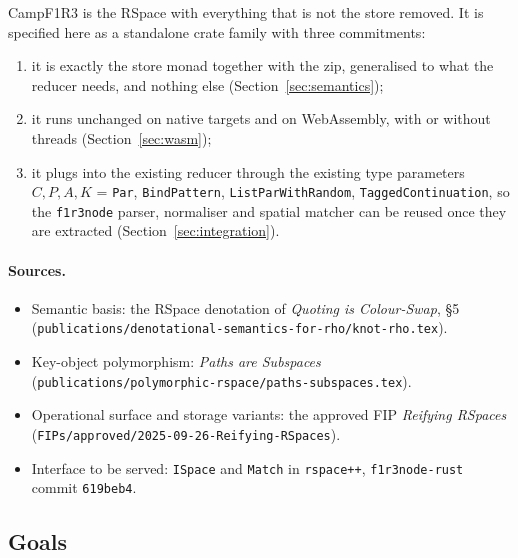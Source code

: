 \documentclass[11pt]{article}
\theoremstyle{plain}
\theoremstyle{definition}
\newcommand{\Camp}{CampF1R3}
\newcommand{\code}[1]{\texttt{#1}}
\begin{document}
\Camp{} is the RSpace with everything that is not the store removed. It is
specified here as a standalone crate family with three commitments:
\begin{enumerate}[nosep]
\item it is exactly the store monad together with the zip, generalised to what
      the reducer needs, and nothing else (Section~\ref{sec:semantics});
\item it runs unchanged on native targets and on WebAssembly, with or without
      threads (Section~\ref{sec:wasm});
\item it plugs into the existing reducer through the existing type parameters
      $C,P,A,K$ = \code{Par}, \code{BindPattern}, \code{ListParWithRandom},
      \code{TaggedContinuation}, so the \code{f1r3node} parser, normaliser and
      spatial matcher can be reused once they are extracted
      (Section~\ref{sec:integration}).
\end{enumerate}

\paragraph{Sources.}
\begin{itemize}[nosep]
\item Semantic basis: the RSpace denotation of \emph{Quoting is Colour-Swap}, \S5\\
      (\code{publications/denotational-semantics-for-rho/knot-rho.tex}).
\item Key-object polymorphism: \emph{Paths are Subspaces}\\
      (\code{publications/polymorphic-rspace/paths-subspaces.tex}).
\item Operational surface and storage variants: the approved FIP \emph{Reifying RSpaces}\\
      (\code{FIPs/approved/2025-09-26-Reifying-RSpaces}).
\item Interface to be served: \code{ISpace} and \code{Match} in \code{rspace++},
      \code{f1r3node-rust} commit \code{619beb4}.
\end{itemize}

\subsection{Goals}
\end{document}
